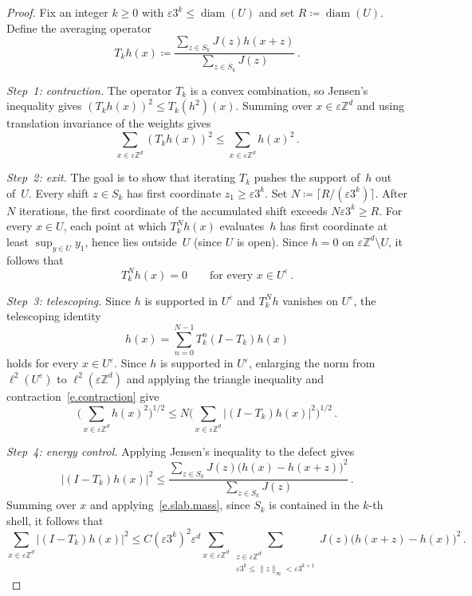 \documentclass[11pt]{amsart}
\theoremstyle{plain}
\theoremstyle{definition}
\theoremstyle{remark}
\newcommand{\Zd}{\mathbb{Z}^d}
\newcommand{\eps}{\varepsilon}
\begin{document}
	\begin{proof}
		Fix an integer $k \ge 0$ with $\eps 3^k \le \operatorname{diam}(U)$ and set $R \coloneqq \operatorname{diam}(U)$.
		Define the averaging operator
		\begin{equation}
			\label{e.Tk}
			T_k h(x) \coloneqq \frac{\sum_{z \in S_k} J(z) h(x{+}z)}{\sum_{z \in S_k} J(z)}\,.
		\end{equation}
		
		\emph{Step~1: contraction.}
		The operator $T_k$ is a convex combination, so Jensen's inequality gives $(T_k h(x))^2 \le T_k(h^2)(x)$.
		Summing over $x \in \eps\Zd$ and using translation invariance of the weights gives
		\begin{equation}
			\label{e.contraction}
			\sum_{x \in \eps\Zd} (T_k h(x))^2 \le \sum_{x \in \eps\Zd} h(x)^2\,.
		\end{equation}
		
		\emph{Step~2: exit.}
		The goal is to show that iterating $T_k$ pushes the support of~$h$ out of~$U$.
		Every shift $z \in S_k$ has first coordinate $z_1 \ge \eps 3^k$.
		Set $N \coloneqq \lceil R / (\eps 3^k) \rceil$.
		After $N$ iterations, the first coordinate of the accumulated shift exceeds $N \eps 3^k \ge R$.
		For every $x \in U$, each point at which $T_k^N h(x)$ evaluates~$h$ has first coordinate at least $\sup_{y \in U} y_1$, hence lies outside~$U$ (since $U$ is open).
		Since $h = 0$ on $\eps\Zd \setminus U$, it follows that
		\begin{equation}
			\label{e.exit}
			T_k^N h(x) = 0 \qquad \text{for every } x \in U^\eps\,.
		\end{equation}
		
		\emph{Step~3: telescoping.}
		Since $h$ is supported in $U^\eps$ and $T_k^N h$ vanishes on $U^\eps$, the telescoping identity
		\[
		h(x) = \sum_{n=0}^{N-1} T_k^n(I - T_k) h(x)
		\]
		holds for every $x \in U^\eps$.
		Since $h$ is supported in $U^\eps$, enlarging the norm from $\ell^2(U^\eps)$ to $\ell^2(\eps\Zd)$ and applying the triangle inequality and contraction~\eqref{e.contraction} give
		\begin{equation}
			\label{e.triangle}
			\biggl(\sum_{x \in \eps\Zd} h(x)^2\biggr)^{1/2}
			\le N \biggl(\sum_{x \in \eps\Zd} \bigl|(I - T_k) h(x)\bigr|^2\biggr)^{1/2}\,.
		\end{equation}
		
		\emph{Step~4: energy control.}
		Applying Jensen's inequality to the defect gives
		\[
		\bigl|(I - T_k)h(x)\bigr|^2
		\le
		\frac{\sum_{z \in S_k} J(z)\bigl(h(x) - h(x{+}z)\bigr)^2}{\sum_{z \in S_k} J(z)}\,.
		\]
		Summing over $x$ and applying~\eqref{e.slab.mass}, since $S_k$ is contained in the $k$-th shell, it follows that
		\begin{equation}
			\label{e.energy.control}
			\sum_{x \in \eps\Zd} \bigl|(I - T_k) h(x)\bigr|^2
			\le
			C (\eps 3^k)^{2} \eps^{d}
			\sum_{x \in \eps\Zd}
			\sum_{\substack{z \in \eps\Zd \\ \eps 3^k \le \|z\|_\infty < \eps 3^{k+1}}}
			J(z)\bigl(h(x{+}z) - h(x)\bigr)^2\,.
		\end{equation}
		

\end{proof}
\end{document}

